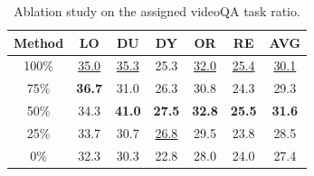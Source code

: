 \begin{table}[t]
\centering

\begin{tabular}{ccccccc}
\toprule
Method  & LO & DU & DY & OR & RE & AVG \\
\midrule
100\% & \underline{35.0} & \underline{35.3} & 25.3 & \underline{32.0} & \underline{25.4} & \underline{30.1} \\
75\%  & \textbf{36.7} & 31.0 & 26.3 & 30.8 & 24.3 & 29.3 \\
50\%  & 34.3 & \textbf{41.0} & \textbf{27.5} & \textbf{32.8} & \textbf{25.5} & \textbf{31.6} \\
25\%  & 33.7 & 30.7 & \underline{26.8} & 29.5 & 23.8 & 28.5 \\
0\%   & 32.3 & 30.3 & 22.8 & 28.0 & 24.0 & 27.4 \\
\bottomrule
\end{tabular}

\caption{Ablation study on the assigned videoQA task ratio.}
\label{tab:two}
\end{table}